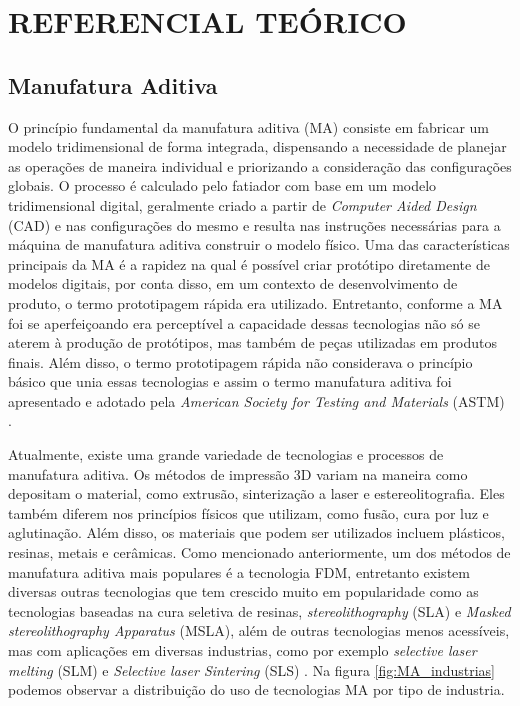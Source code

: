 \chapter{REFERENCIAL TEÓRICO}

\section{Manufatura Aditiva}
O princípio fundamental da manufatura aditiva (MA) consiste em fabricar um modelo tridimensional de forma 
integrada, dispensando a necessidade de planejar as operações de maneira individual e priorizando a 
consideração das configurações globais.
O processo é calculado pelo fatiador com base em um modelo tridimensional digital,
geralmente criado a partir de \textit{Computer Aided Design} (CAD) e nas configurações do mesmo
e resulta nas instruções necessárias para a máquina de manufatura aditiva construir o modelo físico.
Uma das características 
principais da MA é a rapidez na qual é possível criar protótipo
diretamente de modelos digitais, por conta disso, em um contexto 
de desenvolvimento de produto, o termo prototipagem rápida era 
utilizado. Entretanto, conforme a MA foi se aperfeiçoando era 
perceptível a capacidade dessas tecnologias não só se aterem à 
produção de protótipos, mas também de peças utilizadas em 
produtos finais. Além disso, o termo prototipagem rápida não considerava o princípio 
básico que unia essas tecnologias e assim o termo manufatura 
aditiva foi apresentado e adotado pela \textit{American Society for 
Testing and Materials} (ASTM) \cite{gibson15}.

Atualmente, existe uma grande variedade de tecnologias e processos de manufatura aditiva.
Os métodos de impressão 3D variam na maneira como depositam o material, como extrusão, sinterização a 
laser e estereolitografia. Eles também diferem nos princípios físicos que utilizam, como fusão, cura por luz
e aglutinação. Além disso, os materiais que podem ser utilizados incluem plásticos, resinas, metais e cerâmicas. 
Como mencionado anteriormente, um dos métodos de manufatura aditiva mais populares
é a tecnologia FDM, entretanto existem diversas outras tecnologias que tem crescido muito em popularidade
como as tecnologias baseadas na cura seletiva de resinas, \textit{stereolithography} (SLA) e \textit{Masked stereolithography Apparatus} (MSLA),
além de outras tecnologias menos acessíveis, mas com aplicações em diversas industrias, como por exemplo
\textit{selective laser melting} (SLM) e \textit{Selective laser Sintering} (SLS) \cite{bikas16}.  
Na figura \ref{fig:MA_industrias} podemos observar a distribuição do uso de 
tecnologias MA por tipo de industria.   

